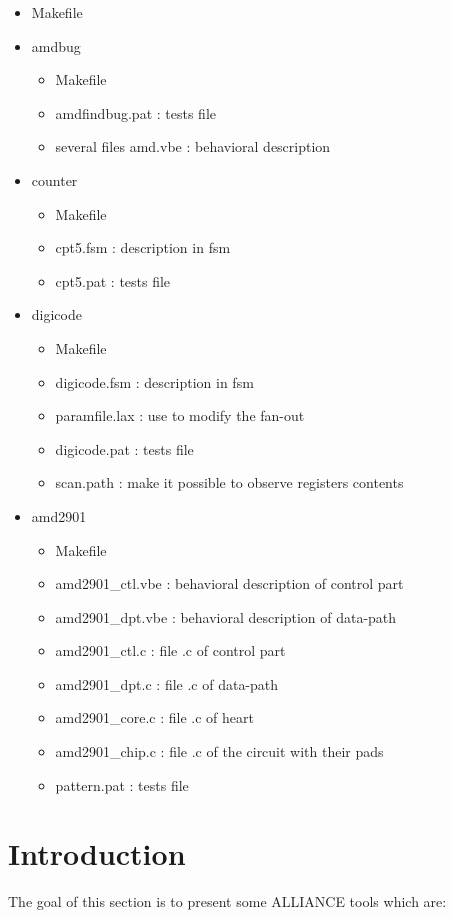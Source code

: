 \documentclass{article}
\begin{document}
{\begin{itemize}
\item   Makefile
\item   amdbug
    \begin{itemize}\itemsep=-.8ex
    \item   Makefile
    \item   amdfindbug.pat : tests file
    \item   several files amd.vbe : behavioral description
    \end{itemize}
\item   counter
    \begin{itemize}\itemsep=-.8ex
    \item   Makefile
    \item   cpt5.fsm : description in fsm
    \item   cpt5.pat : tests file
    \end{itemize}
\item   digicode
    \begin{itemize}\itemsep=-.8ex
    \item   Makefile
    \item   digicode.fsm : description in fsm
    \item   paramfile.lax : use to modify the fan-out
    \item   digicode.pat : tests file
    \item   scan.path : make it possible to observe registers
    contents
    \end{itemize}
\item   amd2901
    \begin{itemize}\itemsep=-.8ex
    \item   Makefile
    \item   amd2901\_ctl.vbe : behavioral description of control
    part
    \item   amd2901\_dpt.vbe : behavioral description of data-path
    \item   amd2901\_ctl.c : file .c of control part
    \item   amd2901\_dpt.c : file .c of data-path
    \item   amd2901\_core.c : file .c of heart
    \item   amd2901\_chip.c : file .c of the circuit with their
    pads
    \item   pattern.pat : tests file
    \end{itemize}
\end{itemize}


\newpage
\section{Introduction}
    The goal of this section is to present some ALLIANCE tools which are:

}
\end{document}
